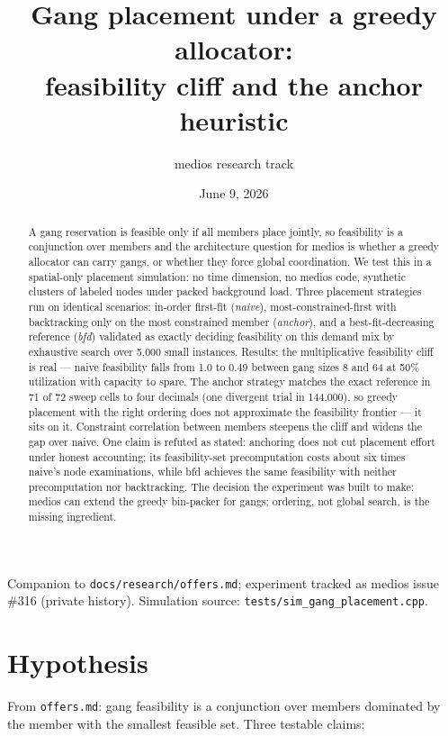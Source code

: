 \documentclass[11pt]{article}
\title{Gang placement under a greedy allocator:\\
feasibility cliff and the anchor heuristic}
\author{medios research track}
\date{June 9, 2026}
\newcommand{\code}[1]{\texttt{#1}}
\begin{document}
\maketitle

\begin{center}
\small Companion to \code{docs/research/offers.md}; experiment tracked as
medios issue \#316 (private history).
Simulation source: \code{tests/sim\_gang\_placement.cpp}.
\end{center}

\begin{abstract}
A gang reservation is feasible only if all members place jointly, so
feasibility is a conjunction over members and the architecture question for
medios is whether a greedy allocator can carry gangs, or whether they force
global coordination. We test this in a spatial-only placement simulation: no
time dimension, no medios code, synthetic clusters of labeled nodes under
packed background load. Three placement strategies run on identical
scenarios: in-order first-fit (\emph{naive}), most-constrained-first with
backtracking only on the most constrained member (\emph{anchor}), and a
best-fit-decreasing reference (\emph{bfd}) validated as exactly deciding
feasibility on this demand mix by exhaustive search over 5{,}000 small
instances. Results: the multiplicative feasibility cliff is real --- naive
feasibility falls from 1.0 to 0.49 between gang sizes 8 and 64 at 50\%
utilization with capacity to spare. The anchor strategy matches the exact
reference in 71 of 72 sweep cells to four decimals (one divergent trial in
144{,}000), so greedy placement with the right ordering does not
approximate the feasibility frontier --- it sits on it. Constraint
correlation between members steepens the cliff and widens the gap over
naive. One claim is refuted as stated: anchoring does not cut placement
effort under honest accounting; its feasibility-set precomputation costs
about six times naive's node examinations, while bfd achieves the same
feasibility with neither precomputation nor backtracking. The decision the
experiment was built to make: medios can extend the greedy bin-packer for
gangs; ordering, not global search, is the missing ingredient.
\end{abstract}

\section{Hypothesis}

From \code{offers.md}: gang feasibility is a conjunction over members
dominated by the member with the smallest feasible set. Three testable
claims:
\end{document}
